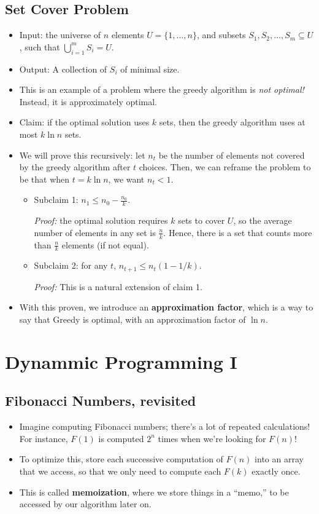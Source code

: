 \documentclass[10pt]{article}
\begin{document}
	\subsection{Set Cover Problem}
	\begin{itemize}
		\item Input: the universe of $n$ elements $U = \{1, \dots, n\}$, and subsets 
			$S_1, S_2, \dots, S_m \subseteq U$, such that $\bigcup_{i = 1}^m S_i = U$. 
		\item Output: A collection of $S_i$ of minimal size.
		\item This is an example of a problem where the greedy algorithm is \textit{not optimal!} Instead, 
			it is approximately optimal. 
		\item Claim: if the optimal solution uses $k$ sets, then the greedy algorithm uses 
			at most $k \ln n$ sets. 
		\item We will prove this recursively: let $n_t$ be the number of elements not covered by the greedy 
			algorithm after $t$ choices. Then, we can reframe the problem to be that 
			when $t = k \ln n$, we want $n_t < 1$. 
			\begin{itemize}
				\item Subclaim 1: $n_1 \le n_0 - \frac{n_0}{k}$. 

					\textit{Proof:} the optimal solution requires $k$ sets to cover $U$, so the 
					average number of elements in any set is $\frac{n}{k}$. Hence, there is a set 
					that counts more than $\frac{n}{k}$ elements (if not equal).
				\item Subclaim 2: for any $t$, $n_{t+1} \le n_t(1 - 1 / k)$.
					
					\textit{Proof:} This is a natural extension of claim 1.  
			\end{itemize}
		\item With this proven, we introduce an \textbf{approximation factor}, which is a way to say that Greedy
			is optimal, with an approximation factor of $\ln n$. 
	\end{itemize}

	\section{Dynammic Programming I}

	\subsection{Fibonacci Numbers, revisited}
	\begin{itemize}
		\item Imagine computing Fibonacci numbers; there's a lot of repeated calculations! For instance, 
			$F(1)$ is computed $2^n$ times when we're looking for $F(n)$!
		\item To optimize this, store each successive computation of $F(n)$ into an array that we access, 
			so that we only need to compute each $F(k)$ exactly once.
		\item This is called \textbf{memoization}, where we store things in a ``memo,'' to be accessed by our 
			algorithm later on. 
	\end{itemize}
\end{document}
